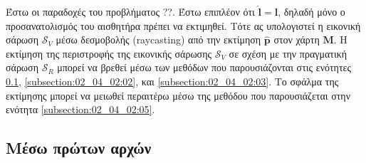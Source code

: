 Έστω οι παραδοχές του προβλήματος ??. Έστω επιπλέον ότι $\hat{\bm{l}} =
\bm{l}$, δηλαδή μόνο ο προσανατολισμός του αισθητήρα πρέπει να εκτιμηθεί. Τότε
ας υπολογιστεί η εικονική σάρωση $\mathcal{S}_V$ μέσω δεσμοβολής (raycasting)
από την εκτίμηση $\hat{\bm{p}}$ στον χάρτη $\bm{M}$. Η εκτίμηση της περιστροφής
της εικονικής σάρωσης $\mathcal{S}_V$ σε σχέση με την πραγματική σάρωση
$\mathcal{S}_R$ μπορεί να βρεθεί μέσω των μεθόδων που παρουσιάζονται στις
ενότητες \ref{subsection:02_04_02:01}, \ref{subsection:02_04_02:02}, και
\ref{subsection:02_04_02:03}. Το σφάλμα της εκτίμησης μπορεί να μειωθεί
περαιτέρω μέσω της μεθόδου που παρουσιάζεται στην ενότητα
\ref{subsection:02_04_02:05}.

\subsection{Μέσω πρώτων αρχών}
\label{subsection:02_04_02:01}


